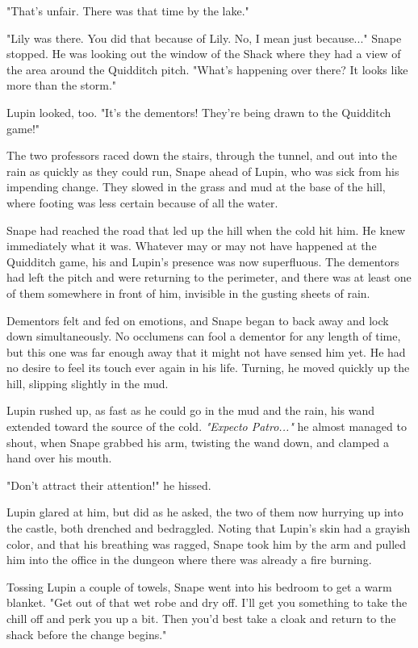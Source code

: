 "That's unfair. There was that time by the lake."

"Lily was there. You did that because of Lily. No, I mean just because..." Snape stopped. He was looking out the window of the Shack where they had a view of the area around the Quidditch pitch. "What's happening over there? It looks like more than the storm."

Lupin looked, too. "It's the dementors! They're being drawn to the Quidditch game!"

The two professors raced down the stairs, through the tunnel, and out into the rain as quickly as they could run, Snape ahead of Lupin, who was sick from his impending change. They slowed in the grass and mud at the base of the hill, where footing was less certain because of all the water.

Snape had reached the road that led up the hill when the cold hit him. He knew immediately what it was. Whatever may or may not have happened at the Quidditch game, his and Lupin's presence was now superfluous. The dementors had left the pitch and were returning to the perimeter, and there was at least one of them somewhere in front of him, invisible in the gusting sheets of rain.

Dementors felt and fed on emotions, and Snape began to back away and lock down simultaneously. No occlumens can fool a dementor for any length of time, but this one was far enough away that it might not have sensed him yet. He had no desire to feel its touch ever again in his life. Turning, he moved quickly up the hill, slipping slightly in the mud.

Lupin rushed up, as fast as he could go in the mud and the rain, his wand extended toward the source of the cold. \emph{"Expecto Patro..."} he almost managed to shout, when Snape grabbed his arm, twisting the wand down, and clamped a hand over his mouth.

"Don't attract their attention!" he hissed.

Lupin glared at him, but did as he asked, the two of them now hurrying up into the castle, both drenched and bedraggled. Noting that Lupin's skin had a grayish color, and that his breathing was ragged, Snape took him by the arm and pulled him into the office in the dungeon where there was already a fire burning.

Tossing Lupin a couple of towels, Snape went into his bedroom to get a warm blanket. "Get out of that wet robe and dry off. I'll get you something to take the chill off and perk you up a bit. Then you'd best take a cloak and return to the shack before the change begins."

